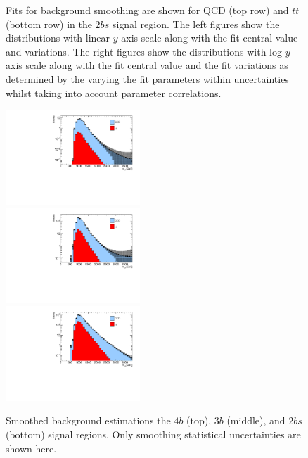 \begin{figure}[htbp!]
\begin{center}
\caption{Fits for background smoothing are shown for QCD (top row) and $t\bar{t}$ (bottom row) in the $2bs$ signal region.  The left figures show the distributions with linear $y$-axis scale along with the fit central value and variations. The right figures show the  distributions with log $y$-axis scale along with the fit central value and the fit variations as determined by the varying the fit parameters within uncertainties whilst taking into account parameter correlations. }
\label{fig:signal-region-2bs-smoothing}
\end{center}
\end{figure}


\begin{figure}[htbp!]
\begin{center}
\includegraphics[width=0.45\textwidth,angle=-90]{figures/boosted/Smooth/FourTag_l_smoothed.pdf}\\
\includegraphics[width=0.45\textwidth,angle=-90]{figures/boosted/Smooth/ThreeTag_l_smoothed.pdf}\\
\includegraphics[width=0.45\textwidth,angle=-90]{figures/boosted/Smooth/TwoTag_split_l_smoothed.pdf}\\
\caption{Smoothed background estimations the $4b$ (top), $3b$ (middle), and $2bs$ (bottom) signal regions. Only smoothing statistical uncertainties are shown here. }
\label{fig:signal-region-smooth-bkg}
\end{center}
\end{figure}



